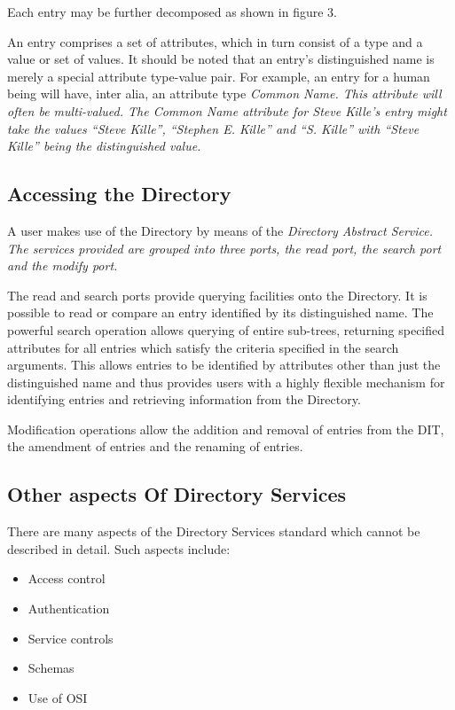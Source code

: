 Each entry may be further decomposed as shown in figure 3.
\begin{figure}
\begin{minipage}\columnwidth
\small
\relax\centerline{\box\graph}
\end{minipage}
\end{figure}

An entry comprises a set of attributes, which in turn consist of a type and
a value or set of values.  It should be noted that an entry's distinguished
name is merely a special attribute type-value pair.  For example, an entry
for a human being will have, inter alia, an attribute type
\it
Common Name.
\rm
This attribute will often be multi-valued.  The Common Name attribute for
Steve Kille's entry might take the values ``Steve Kille'', ``Stephen E. Kille''
and ``S. Kille'' with ``Steve Kille'' being the distinguished value.


\subsection{Accessing the Directory}

A user makes use of the Directory by means of the
\it
Directory Abstract Service.
\rm
The services provided are grouped into three
\it
ports,
\rm
the read port, the search port and the modify port. 

The read and search
ports provide querying facilities onto the Directory.  It is possible to
read or compare an entry identified by its distinguished name. The powerful
search operation allows querying of entire sub-trees, returning specified
attributes for all entries which satisfy the criteria specified in the search
arguments.  This allows entries to be identified by attributes other than
just the distinguished name and thus provides users with a highly flexible
mechanism for identifying entries and retrieving information 
from the Directory.

Modification operations allow the addition and removal of
entries from the DIT, the amendment of entries and the renaming of entries.
\subsection{Other aspects Of Directory Services}

There are many aspects of the Directory Services standard which cannot be
described in detail. Such aspects include:
\begin{itemize}
\item
Access control
\item
Authentication
\item
Service controls
\item
Schemas
\item
Use of OSI
\end{itemize}

